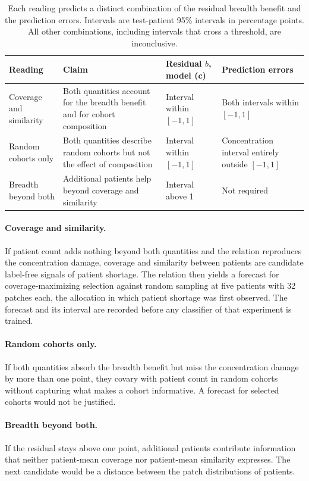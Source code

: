 \documentclass[11pt]{article}
\begin{document}
\begin{table}[htbp]
\centering
\renewcommand{\arraystretch}{1.15}
\begin{tabularx}{\textwidth}{@{}lYYY@{}}
\toprule
Reading & Claim & Residual $b$, model (c) & Prediction errors \\
\midrule
Coverage and similarity & Both quantities account for the breadth benefit and for cohort composition & Interval within $[-1,1]$ & Both intervals within $[-1,1]$ \\
\addlinespace
Random cohorts only & Both quantities describe random cohorts but not the effect of composition & Interval within $[-1,1]$ & Concentration interval entirely outside $[-1,1]$ \\
\addlinespace
Breadth beyond both & Additional patients help beyond coverage and similarity & Interval above 1 & Not required \\
\bottomrule
\end{tabularx}
\caption{Each reading predicts a distinct combination of the residual breadth benefit and the prediction errors. Intervals are test-patient 95\% intervals in percentage points. All other combinations, including intervals that cross a threshold, are inconclusive.}
\label{tab:readings}
\end{table}

\paragraph{Coverage and similarity.}
If patient count adds nothing beyond both quantities and the relation reproduces the concentration damage, coverage and similarity between patients are candidate label-free signals of patient shortage. The relation then yields a forecast for coverage-maximizing selection against random sampling at five patients with 32 patches each, the allocation in which patient shortage was first observed. The forecast and its interval are recorded before any classifier of that experiment is trained.

\paragraph{Random cohorts only.}
If both quantities absorb the breadth benefit but miss the concentration damage by more than one point, they covary with patient count in random cohorts without capturing what makes a cohort informative. A forecast for selected cohorts would not be justified.

\paragraph{Breadth beyond both.}
If the residual stays above one point, additional patients contribute information that neither patient-mean coverage nor patient-mean similarity expresses. The next candidate would be a distance between the patch distributions of patients.
\end{document}
